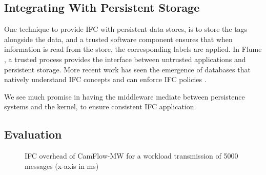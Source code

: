 \documentclass[10pt,journal,compsoc]{IEEEtran}
\begin{document}
\subsection{Integrating With Persistent Storage}
\label{sec:os:service}



One technique to provide IFC with persistent data stores, 
is to store the tags alongside the data,
and a trusted software component ensures that when information is read from the store, the corresponding labels are applied. 
In Flume \cite{Krohn:2007:IFC:1294261.1294293}, a trusted process provides the interface between untrusted applications and persistent storage.
More recent work has seen the emergence of databases that natively understand IFC concepts and can enforce IFC policies \cite{Schultz:2013:IDI:2465351.2465357}. 

We 
see much promise in having the middleware mediate between persistence systems and the kernel, to ensure consistent IFC application.



\subsection{Evaluation}







\begin{figure}[t]
\centering
{}
  \caption{IFC overhead of CamFlow-MW for a workload transmission of 5000 messages (x-axis in ms)     }
    \label{image:mw:eval}
\end{figure}
\end{document}
